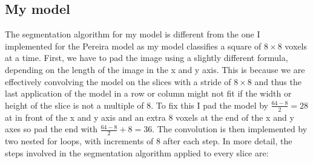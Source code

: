\documentclass[12pt,a4paper,twoside,openright]{report}
\begin{document}
\subsection{My model}
The segmentation algorithm for my model is different from the one I implemented for the Pereira model as my model classifies a square of $8 \times 8$ voxels at a time. First, we have to pad the image using a slightly different formula, depending on the length of the image in the x and y axis. This is because we are effectively convolving the model on the slices with a stride of $8 \times 8$ and thus the last application of the model in a row or column might not fit if the width or height of the slice is not a multiple of 8. To fix this I pad the model by $\frac{64 -8}{2} = 28$ at in front of the x and y axis and an extra 8 voxels at the end of the x and y axes so pad the end with $\frac{64 -8}{2} + 8 = 36$. The convolution is then implemented by two nested for loops, with increments of 8 after each step. In more detail, the steps involved in the segmentation algorithm applied to every slice are:
\end{document}

